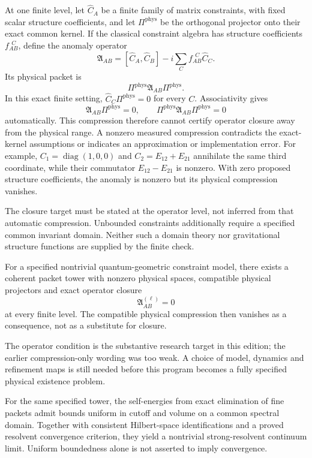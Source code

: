 At one finite level, let $\widehat C_A$ be a finite family of matrix constraints, with fixed scalar structure coefficients, and let $\Pi^{\mathrm{phys}}$ be the orthogonal projector onto their exact common kernel. If the classical constraint algebra has structure coefficients $f_{AB}^{\ \ C}$, define the anomaly operator
\[
\boxed{
\mathfrak A_{AB}
=
[\widehat C_A,\widehat C_B]
-i\sum_C f_{AB}^{\ \ C}\widehat C_C.
}
\]
Its physical packet is
\[
\Pi^{\mathrm{phys}}\mathfrak A_{AB}\Pi^{\mathrm{phys}}.
\]
In this exact finite setting, $\widehat C_C\Pi^{\mathrm{phys}}=0$ for every $C$. Associativity gives
\[
\mathfrak A_{AB}\Pi^{\mathrm{phys}}=0,
\qquad
\Pi^{\mathrm{phys}}\mathfrak A_{AB}\Pi^{\mathrm{phys}}=0
\]
automatically. This compression therefore cannot certify operator closure away from the physical range. A nonzero measured compression contradicts the exact-kernel assumptions or indicates an approximation or implementation error. For example, $C_1=\operatorname{diag}(1,0,0)$ and $C_2=E_{12}+E_{21}$ annihilate the same third coordinate, while their commutator $E_{12}-E_{21}$ is nonzero. With zero proposed structure coefficients, the anomaly is nonzero but its physical compression vanishes.

The closure target must be stated at the operator level, not inferred from that automatic compression. Unbounded constraints additionally require a specified common invariant domain. Neither such a domain theory nor gravitational structure functions are supplied by the finite check.

\begin{conjecture}\label{core:conjecture:001}
For a specified nontrivial quantum-geometric constraint model, there exists a coherent packet tower with nonzero physical spaces, compatible physical projectors and exact operator closure
\[
\mathfrak A^{(\ell)}_{AB}=0
\]
at every finite level. The compatible physical compression then vanishes as a consequence, not as a substitute for closure.
\end{conjecture}
The operator condition is the substantive research target in this edition; the earlier compression-only wording was too weak. A choice of model, dynamics and refinement maps is still needed before this program becomes a fully specified physical existence problem.

\begin{conjecture}\label{core:conjecture:002}
For the same specified tower, the self-energies from exact elimination of fine packets admit bounds uniform in cutoff and volume on a common spectral domain. Together with consistent Hilbert-space identifications and a proved resolvent convergence criterion, they yield a nontrivial strong-resolvent continuum limit. Uniform boundedness alone is not asserted to imply convergence.
\end{conjecture}

